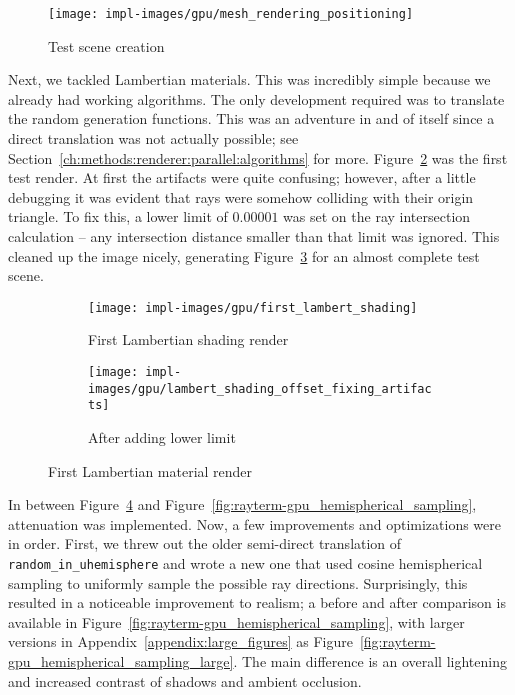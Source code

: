 \vspace{0.3em}
\begin{figure}[htb]
  \centering
  \texttt{[image: impl-images/gpu/mesh\_rendering\_positioning]}
  \caption{Test scene creation}
  \label{fig:rayterm-gpu_test_scene_creation}
\end{figure}

Next, we tackled Lambertian materials.
This was incredibly simple because we already had working algorithms.
The only development required was to translate the random generation functions.
This was an adventure in and of itself since a direct translation was not actually possible; see Section~\ref{ch:methods:renderer:parallel:algorithms} for more.
Figure~\ref{fig:rayterm-gpu_artifacts} was the first test render.
At first the artifacts were quite confusing; however, after a little debugging it was evident that rays were somehow colliding with their origin triangle.
To fix this, a lower limit of $0.00001$ was set on the ray intersection calculation -- any intersection distance smaller than that limit was ignored.
This cleaned up the image nicely, generating Figure~\ref{fig:rayterm-gpu_fixed_artifacts} for an almost complete test scene.

\vspace{0.3em}
\begin{figure}[htb]
  \centering
  \begin{subfigure}[htb]{0.45\textwidth}
    \texttt{[image: impl-images/gpu/first\_lambert\_shading]}
    \caption{First Lambertian shading render}
    \label{fig:rayterm-gpu_artifacts}
  \end{subfigure}
  \begin{subfigure}[htb]{0.45\textwidth}
    \texttt{[image: impl-images/gpu/lambert\_shading\_offset\_fixing\_artifacts]}
    \caption{After adding lower limit}
    \label{fig:rayterm-gpu_fixed_artifacts}
  \end{subfigure}
  \caption{First Lambertian material render}
  \label{fig:rayterm-gpu_lambert}
\end{figure}

In between Figure~\ref{fig:rayterm-gpu_lambert} and Figure~\ref{fig:rayterm-gpu_hemispherical_sampling}, attenuation was implemented.
Now, a few improvements and optimizations were in order.
First, we threw out the older semi-direct translation of \texttt{random\_in\_uhemisphere} and wrote a new one that used cosine hemispherical sampling to uniformly sample the possible ray directions.
Surprisingly, this resulted in a noticeable improvement to realism; a before and after comparison is available in Figure~\ref{fig:rayterm-gpu_hemispherical_sampling}, with larger versions in Appendix~\ref{appendix:large_figures} as Figure~\ref{fig:rayterm-gpu_hemispherical_sampling_large}.
The main difference is an overall lightening and increased contrast of shadows and ambient occlusion.

